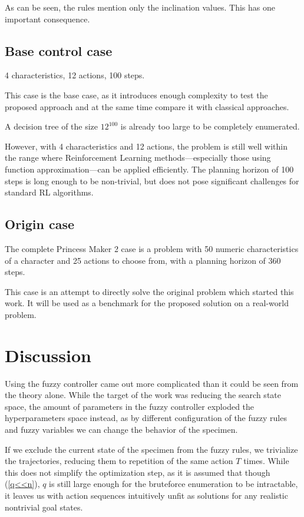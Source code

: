 \documentclass[11pt, a4paper]{article}
\begin{document}
	As can be seen, the rules mention only the inclination values.
	This has one important consequence.
	
	
	\subsection{Base control case}
    
	4 characteristics, 12 actions, 100 steps.

	This case is the base case, as it introduces enough complexity to test the proposed approach and at the same time compare it with classical approaches.

	A decision tree of the size $12^{100}$ is already too large to be completely enumerated.

	However, with 4 characteristics and 12 actions, the problem is still well within the range where Reinforcement Learning methods—especially those using function approximation—can be applied efficiently.
	The planning horizon of 100 steps is long enough to be non-trivial, but does not pose significant challenges for standard RL algorithms.

	\subsection{Origin case}

	The complete Princess Maker 2 case is a problem with 50 numeric characteristics of a character and 25 actions to choose from, with a planning horizon of 360 steps.

	This case is an attempt to directly solve the original problem which started this work.
	It will be used as a benchmark for the proposed solution on a real-world problem.

	\section{Discussion}

	Using the fuzzy controller came out more complicated than it could be seen from the theory alone.
	While the target of the work was reducing the search state space, the amount of parameters in the fuzzy controller exploded the hyperparameters space instead, as by different configuration of the fuzzy rules and fuzzy variables we can change the behavior of the specimen.
	
	If we exclude the current state of the specimen from the fuzzy rules, we trivialize the trajectories, reducing them to repetition of the same action $T$ times.
	While this does not simplify the optimization step, as it is assumed that though (\ref{q<<n}), $q$ is still large enough for the bruteforce enumeration to be intractable, it leaves us with action sequences intuitively unfit as solutions for any realistic nontrivial goal states.
\end{document}
